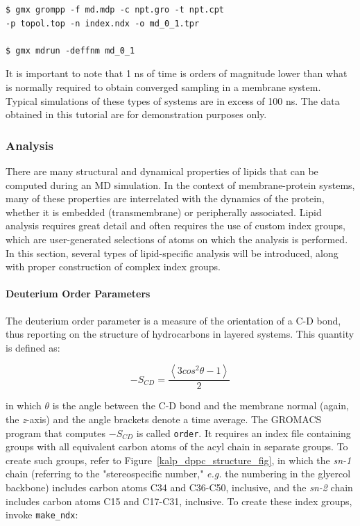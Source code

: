 \documentclass[9pt,tutorial]{livecoms}
\begin{document}
\begin{verbatim}
$ gmx grompp -f md.mdp -c npt.gro -t npt.cpt
-p topol.top -n index.ndx -o md_0_1.tpr

$ gmx mdrun -deffnm md_0_1
\end{verbatim}

It is important to note that 1 ns of time is orders of magnitude lower than what is normally required to obtain converged sampling in a membrane system. Typical simulations of these types of systems are in excess of 100 ns. The data obtained in this tutorial are for demonstration purposes only.

\subsubsection{Analysis} \label{kalp_ana}

There are many structural and dynamical properties of lipids that can be computed during an MD simulation. In the context of membrane-protein systems, many of these properties are interrelated with the dynamics of the protein, whether it is embedded (transmembrane) or peripherally associated. Lipid analysis requires great detail and often requires the use of custom index groups, which are user-generated selections of atoms on which the analysis is performed. In this section, several types of lipid-specific analysis will be introduced, along with proper construction of complex index groups.

\paragraph{Deuterium Order Parameters} \label{kalp_ana_scd}

The deuterium order parameter is a measure of the orientation of a C-D bond, thus reporting on the structure of hydrocarbons in layered systems. This quantity is defined as:

\begin{equation} \label{eq_scd}
-S_{CD} = \frac{\left\langle 3 cos^2 \theta - 1\right\rangle}{2}
\end{equation}

in which $\theta$ is the angle between the C-D bond and the membrane normal (again, the {\em z}-axis) and the angle brackets denote a time average. The GROMACS program that computes $-S_{CD}$ is called \texttt{order}. It requires an index file containing groups with all equivalent carbon atoms of the acyl chain in separate groups. To create such groups, refer to Figure~\ref{kalp_dppc_structure_fig}, in which the {\em sn-1} chain (referring to the "stereospecific number," {\em e.g.} the numbering in the glyercol backbone) includes carbon atoms C34 and C36-C50, inclusive, and the {\em sn-2} chain includes carbon atoms C15 and C17-C31, inclusive. To create these index groups, invoke \texttt{make\_ndx}:
\end{document}
